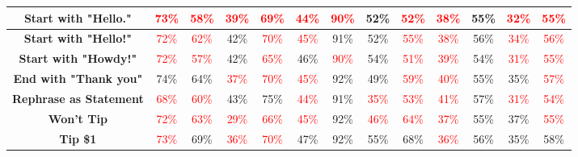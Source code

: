 \documentclass[11pt, dvipsnames]{article}
\begin{document}
\begin{table}
\begin{tabular}{|c|c|c|c|c|c|c|c|c|c|c|c||c|}
		\hline
		\textbf{\textcolor{Perturbations}{Start with "Hello."}} & \textcolor{red}{73\%} & \textcolor{red}{58\%} & \textcolor{red}{39\%} & \textcolor{red}{69\%} & \textcolor{red}{44\%} & \textcolor{red}{90\%} & \textcolor{happygreen}{52\%} & \textcolor{red}{52\%} & \textcolor{red}{38\%} & \textcolor{happygreen}{55\%} & \textcolor{red}{32\%} & \textcolor{red}{55\%}\\
		\hline
		\textbf{\textcolor{Perturbations}{Start with "Hello!"}} & \textcolor{red}{72\%} & \textcolor{red}{62\%} &     42\% & \textcolor{red}{70\%} & \textcolor{red}{45\%} &     91\% & \textcolor{happygreen}{52\%} & \textcolor{red}{55\%} & \textcolor{red}{38\%} & \textcolor{happygreen}{56\%} & \textcolor{red}{34\%} & \textcolor{red}{56\%}\\
		\hline
		\textbf{\textcolor{Perturbations}{Start with "Howdy!"}} & \textcolor{red}{72\%} & \textcolor{red}{57\%} &     42\% & \textcolor{red}{65\%} &     46\% & \textcolor{red}{90\%} & \textcolor{happygreen}{54\%} & \textcolor{red}{51\%} & \textcolor{red}{39\%} &     54\% & \textcolor{red}{31\%} & \textcolor{red}{55\%}\\
		\hline
		\textbf{\textcolor{Perturbations}{End with "Thank you"}} &     74\% &     64\% & \textcolor{red}{37\%} & \textcolor{red}{70\%} & \textcolor{red}{45\%} & \textcolor{happygreen}{92\%} & \textcolor{happygreen}{49\%} & \textcolor{red}{59\%} & \textcolor{red}{40\%} & \textcolor{happygreen}{55\%} &     35\% & \textcolor{red}{57\%}\\
		\hline
		\textbf{\textcolor{Perturbations}{Rephrase as Statement}} & \textcolor{red}{68\%} & \textcolor{red}{60\%} & \textcolor{happygreen}{43\%} & \textcolor{happygreen}{75\%} & \textcolor{red}{44\%} &     91\% & \textcolor{red}{35\%} & \textcolor{red}{53\%} & \textcolor{red}{41\%} & \textcolor{happygreen}{57\%} & \textcolor{red}{31\%} & \textcolor{red}{54\%}\\
		\hline
		\textbf{\textcolor{Tipping}{Won't Tip}} & \textcolor{red}{72\%} & \textcolor{red}{63\%} & \textcolor{red}{29\%} & \textcolor{red}{66\%} & \textcolor{red}{45\%} & \textcolor{happygreen}{92\%} & \textcolor{red}{46\%} & \textcolor{red}{64\%} & \textcolor{red}{37\%} & \textcolor{happygreen}{55\%} & \textcolor{happygreen}{37\%} & \textcolor{red}{55\%}\\
		\hline
		\textbf{\textcolor{Tipping}{Tip \$1}} & \textcolor{red}{73\%} & \textcolor{happygreen}{69\%} & \textcolor{red}{36\%} & \textcolor{red}{70\%} & \textcolor{happygreen}{47\%} & \textcolor{happygreen}{92\%} & \textcolor{happygreen}{55\%} & \textcolor{happygreen}{68\%} & \textcolor{red}{36\%} & \textcolor{happygreen}{56\%} &     35\% &     58\%\\

\end{tabular}
\end{table}
\end{document}
